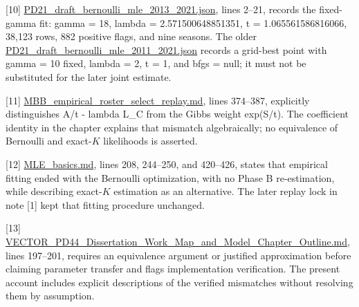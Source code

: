 {[}10{]} \href{file:///Users/charleslevine/Library/CloudStorage/Dropbox/1-Documents/00-\%20Dissertation/0-Next_Chapter/Code_and_Data/New\%20SQL\%20and\%20PY\%20Code/Cursor\%20Workspace\%20PDE/3-Master_Plan/re_entry/HEROs_and_PASSes/pd21_mle/PD21_draft_bernoulli_mle_2013_2021.json}{PD21\_\allowbreak{}draft\_\allowbreak{}bernoulli\_\allowbreak{}mle\_\allowbreak{}2013\_\allowbreak{}2021.json}, lines 2--21, records the fixed-gamma fit: gamma = 18, lambda = 2.571500648851351, t = 1.065561586816066, 38,123 rows, 882 positive flags, and nine seasons. The older \href{file:///Users/charleslevine/Library/CloudStorage/Dropbox/1-Documents/00-\%20Dissertation/0-Next_Chapter/Code_and_Data/New\%20SQL\%20and\%20PY\%20Code/Cursor\%20Workspace\%20PDE/3-Master_Plan/re_entry/HEROs_and_PASSes/pd21_mle/PD21_draft_bernoulli_mle_2011_2021.json}{PD21\_\allowbreak{}draft\_\allowbreak{}bernoulli\_\allowbreak{}mle\_\allowbreak{}2011\_\allowbreak{}2021.json} records a grid-best point with gamma = 10 fixed, lambda = 2, t = 1, and bfgs = null; it must not be substituted for the later joint estimate.

{[}11{]} \href{file:///Users/charleslevine/Library/CloudStorage/Dropbox/1-Documents/00-\%20Dissertation/0-Next_Chapter/Code_and_Data/New\%20SQL\%20and\%20PY\%20Code/Cursor\%20Workspace\%20PDE/3-Master_Plan/re_entry/HEROs_and_PASSes/MBB_empirical_roster_select_replay.md}{MBB\_\allowbreak{}empirical\_\allowbreak{}roster\_\allowbreak{}select\_\allowbreak{}replay.md}, lines 374--387, explicitly distinguishes A/t - lambda L\_\allowbreak{}C from the Gibbs weight exp(S/t). The coefficient identity in the chapter explains that mismatch algebraically; no equivalence of Bernoulli and exact-\(K\) likelihoods is asserted.

{[}12{]} \href{file:///Users/charleslevine/Library/CloudStorage/Dropbox/1-Documents/00-\%20Dissertation/0-Next_Chapter/Code_and_Data/New\%20SQL\%20and\%20PY\%20Code/Cursor\%20Workspace\%20PDE/3-Master_Plan/MLE/MLE_basics.md}{MLE\_\allowbreak{}basics.md}, lines 208, 244--250, and 420--426, states that empirical fitting ended with the Bernoulli optimization, with no Phase B re-estimation, while describing exact-\(K\) estimation as an alternative. The later replay lock in note {[}1{]} kept that fitting procedure unchanged.

{[}13{]} \href{file:///Users/charleslevine/Library/CloudStorage/Dropbox/1-Documents/00-\%20Dissertation/0-Next_Chapter/Code_and_Data/New\%20SQL\%20and\%20PY\%20Code/Cursor\%20Workspace\%20PDE/3-Master_Plan/VECTOR_work/new_VECTOR_work/VECTOR_PD44_Dissertation_Work_Map_and_Model_Chapter_Outline.md}{VECTOR\_\allowbreak{}PD44\_\allowbreak{}Dissertation\_\allowbreak{}Work\_\allowbreak{}Map\_\allowbreak{}and\_\allowbreak{}Model\_\allowbreak{}Chapter\_\allowbreak{}Outline.md}, lines 197--201, requires an equivalence argument or justified approximation before claiming parameter transfer and flags implementation verification. The present account includes explicit descriptions of the verified mismatches without resolving them by assumption.

